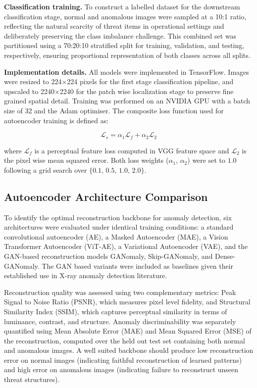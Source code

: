 \documentclass{bmvc2k}
\begin{document}
\textbf{Classification training.} To construct a labelled dataset for the downstream classification stage, normal and anomalous images were sampled at a 10:1 ratio, reflecting the natural scarcity of threat items in operational settings and deliberately preserving the class imbalance challenge. This combined set was partitioned using a 70:20:10 stratified split for training, validation, and testing, respectively, ensuring proportional representation of both classes across all splits.

\textbf{Implementation details.} All models were implemented in TensorFlow. Images were resized to 224×224 pixels for the first stage classification pipeline, and upscaled to 2240×2240 for the patch wise localization stage to preserve fine grained spatial detail. Training was performed on an NVIDIA GPU with a batch size of 32 and the Adam optimiser. The composite loss function used for autoencoder training is defined as:

\[
\mathcal{L}_s = \alpha_1 \mathcal{L}_f + \alpha_2 \mathcal{L}_2
\]

where $\mathcal{L}_f$ is a perceptual feature loss computed in VGG feature space and $\mathcal{L}_2$ is the pixel wise mean squared error. Both loss weights ($\alpha_1$, $\alpha_2$) were set to $1.0$ following a grid search over $\{0.1,\,0.5,\,1.0,\,2.0\}$.

\subsection{Autoencoder Architecture Comparison}

To identify the optimal reconstruction backbone for anomaly detection, six architectures were evaluated under identical training conditions: a standard convolutional autoencoder (AE), a Masked Autoencoder (MAE), a Vision Transformer Autoencoder (ViT-AE), a Variational Autoencoder (VAE), and the GAN-based reconstruction models GANomaly, Skip-GANomaly, and Dense-GANomaly. The GAN based variants were included as baselines given their established use in X-ray anomaly detection literature.

Reconstruction quality was assessed using two complementary metrics: Peak Signal to Noise Ratio (PSNR), which measures pixel level fidelity, and Structural Similarity Index (SSIM), which captures perceptual similarity in terms of luminance, contrast, and structure. Anomaly discriminability was separately quantified using Mean Absolute Error (MAE) and Mean Squared Error (MSE) of the reconstruction, computed over the held out test set containing both normal and anomalous images. A well suited backbone should produce low reconstruction error on normal images (indicating faithful reconstruction of learned patterns) and high error on anomalous images (indicating failure to reconstruct unseen threat structures).
\end{document}
